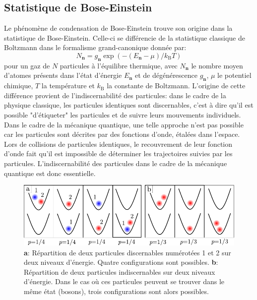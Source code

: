 \subsection{Statistique de Bose-Einstein}
Le phénomène de condensation de Bose-Einstein trouve son origine dans la statistique de Bose-Einstein. Celle-ci se différencie de la statistique classique de Boltzmann dans le formalisme grand-canonique donnée par:
\begin{equation}
N_{\mathbf{n}}=g_{\mathbf{n}} \exp{\left( -(E_{\mathbf{n}}-\mu)/k_{\mathrm{B}}T \right)}
\end{equation}
pour un gaz de $N$ particules à l'équilibre thermique, avec $N_{\mathbf{n}}$ le nombre moyen d'atomes présents dans l'état d'énergie $E_{\mathbf{n}}$ et de dégénérescence $g_{\mathbf{n}}$, $\mu$ le potentiel chimique, $T$ la température et $k_{\mathrm{B}}$ la constante de Boltzmann. L'origine de cette différence provient de l'indiscernabilité des particules: dans le cadre de la physique classique, les particules identiques sont discernables, c'est à dire qu'il est possible "d'étiqueter" les particules et de suivre leurs mouvements individuels.
Dans le cadre de la mécanique quantique, une telle approche n'est pas possible car les particules sont décrites par des fonctions d'onde, étalées dans l'espace. Lors de collisions de particules identiques, le recouvrement de leur fonction d'onde fait qu'il est impossible de déterminer les trajectoires suivies par les particules. L'indiscernabilité des particules dans le cadre de la mécanique quantique est donc essentielle.

\begin{figure}
\centering
\includegraphics[width=\textwidth]{Fig/BEC_manip/stat_bose.pdf}
\caption{\textbf{a}: Répartition de deux particules discernables numérotées 1 et 2 sur deux niveaux d'énergie. Quatre configurations sont possibles. \textbf{b}: Répartition de deux particules indiscernables sur deux niveaux d'énergie. Dans le cas où ces particules peuvent se trouver dans le même état (bosons), trois configurations sont alors possibles.}
\label{fig:stat_bose}
\end{figure}

